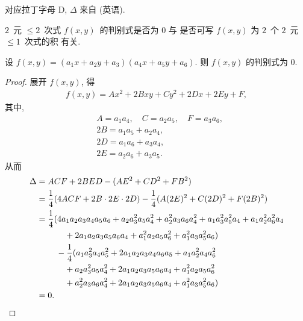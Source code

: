 \documentclass[../libro.tex]{subfiles}
\begin{document}
对应拉丁字母 D,
\(\Delta\) 来自  (英语).

\(2\)~元 \({\leq} 2\)~次式 \(f(x, y)\)~的判别式是否为 \(0\)
与%
是否可写 \(f(x, y)\) 为%
\(2\)~个 \(2\)~元 \({\leq} 1\)~次式的积%
有关.

\begin{theorem}
    设 \(f(x, y) = (a_1 x + a_2 y + a_3) (a_4 x + a_5 y + a_6)\).
    则 \(f(x, y)\) 的判别式为 \(0\).
\end{theorem}

\begin{proof}
    展开 \(f(x, y)\), 得
    \begin{align*}
        f(x,y) = A x^2 + 2B xy + C y^2 + 2D x + 2E y + F,
    \end{align*}
    其中,
    \begin{align*}
        & A = a_1 a_4, \quad C = a_2 a_5, \quad F = a_3 a_6, \\
        & 2B = a_1 a_5 + a_2 a_4,                            \\
        & 2D = a_1 a_6 + a_3 a_4,                            \\
        & 2E = a_2 a_6 + a_3 a_5.
    \end{align*}
    从而
    \begin{align*}
        \Delta
        = {} &
        ACF + 2BED - (AE^2 + CD^2 + FB^2)
        \\
        = {} &
        \frac{1}{4} (4ACF + 2B \cdot 2E \cdot 2D) - \frac{1}{4} (A (2E)^2 + C (2D)^2 + F(2B)^2)
        \\
        = {} &
        \frac{1}{4} (4 a_1 a_2 a_3 a_4 a_5 a_6 + a_2 a_3^2 a_5 a_4^2+a_2^2 a_3 a_6 a_4^2+a_1 a_3^2 a_5^2 a_4+a_1 a_2^2 a_6^2 a_4
            \\
            & \quad \quad
        +2 a_1 a_2 a_3 a_5 a_6 a_4+a_1^2 a_2 a_5 a_6^2+a_1^2 a_3 a_5^2 a_6)
        \\
        & \quad
        - \frac{1}{4} (a_1 a_3^2 a_4 a_5^2+2 a_1 a_2 a_3 a_4 a_6 a_5+a_1 a_2^2 a_4 a_6^2
            \\
            & \quad \quad +a_2 a_3^2 a_5 a_4^2+2 a_1 a_2 a_3 a_5 a_6 a_4+a_1^2 a_2 a_5 a_6^2
            \\
            & \quad \quad
        +a_2^2 a_3 a_6 a_4^2+2 a_1 a_2 a_3 a_5 a_6 a_4+a_1^2 a_3 a_5^2 a_6)
        \\
        = {} & 0.
        \qedhere
    \end{align*}
\end{proof}
\end{document}
